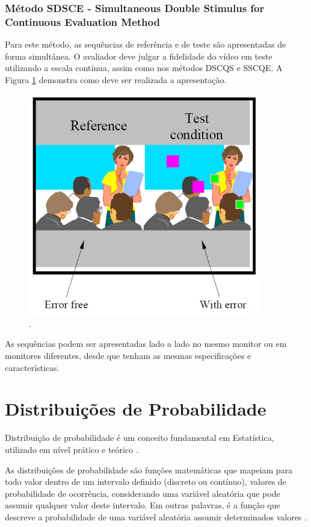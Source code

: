 \subsubsection[Método SDSCE]{Método SDSCE - Simultaneous Double Stimulus for Continuous Evaluation Method}

Para este método, as sequências de referência e de teste são apresentadas de forma simultânea. O avaliador deve julgar a fidelidade do vídeo em teste utilizando a escala contínua, assim como nos métodos DSCQS e SSCQE. A Figura \ref{fig:sdsce} demonstra como deve ser realizada a apresentação.

\begin{figure}[!htb]
	\centering
	\includegraphics[width=0.9\textwidth]{./imgs/sdsce.png}
	\caption{.}
	\label{fig:sdsce}
\end{figure}

As sequências podem ser apresentadas lado a lado no mesmo monitor ou em monitores diferentes, desde que tenham as mesmas especificações e características.

\section{Distribuições de Probabilidade}

Distribuição de probabilidade é um conceito fundamental em Estatística, utilizado em nível prático e teórico \cite{distteoria}.

As distribuições de probabilidade são funções matemáticas que mapeiam para todo valor dentro de um intervalo definido (discreto ou contínuo), valores de probabilidade de ocorrência, considerando uma variável aleatória que pode assumir qualquer valor deste intervalo\cite{distteoria}. Em outras palavras, é a função que descreve a probabilidade de uma variável aleatória assumir determinados valores \cite{wikidistribuicoes}.
 
